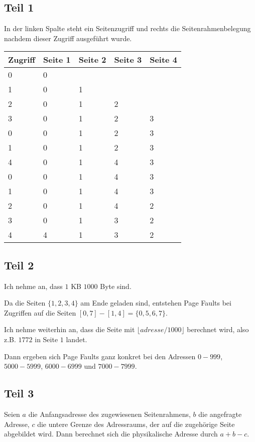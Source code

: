 \documentclass[10pt,a4paper]{article}
\begin{document}
\subsection*{Teil 1}

In der linken Spalte steht ein Seitenzugriff und rechts die Seitenrahmenbelegung nachdem dieser Zugriff ausgeführt wurde.

\begin{tabular}{|l|l|l|l|l|}
\hline
Zugriff & Seite 1 & Seite 2 & Seite 3 & Seite 4\\
\hline
0 & 0 & & &\\
1 & 0 & 1 & &\\
2 & 0 & 1 & 2 &\\
3 & 0 & 1 & 2 & 3\\
0 & 0 & 1 & 2 & 3\\
1 & 0 & 1 & 2 & 3\\
4 & 0 & 1 & 4 & 3\\
0 & 0 & 1 & 4 & 3\\
1 & 0 & 1 & 4 & 3\\
2 & 0 & 1 & 4 & 2\\
3 & 0 & 1 & 3 & 2\\
4 & 4 & 1 & 3 & 2
\end{tabular}

\subsection*{Teil 2}

Ich nehme an, dass $1$ KB $1000$ Byte sind.

Da die Seiten $\{1, 2, 3, 4\}$ am Ende geladen sind, entstehen Page Faults bei Zugriffen auf die Seiten $[0, 7] - [1, 4] = \{0, 5, 6, 7\}$.

Ich nehme weiterhin an, dass die Seite mit $\lfloor adresse / 1000 \rfloor$ berechnet wird, also z.B. $1772$ in Seite $1$ landet.

Dann ergeben sich Page Faults ganz konkret bei den Adressen $0 - 999$, $5000 - 5999$, $6000 - 6999$ und $7000 - 7999$.

\subsection*{Teil 3}

Seien $a$ die Anfangsadresse des zugewiesenen Seitenrahmens, $b$ die angefragte Adresse, $c$ die untere Grenze des Adressraums, der auf die zugehörige Seite abgebildet wird.
Dann berechnet sich die physikalische Adresse durch $a + b - c$.
\end{document}
